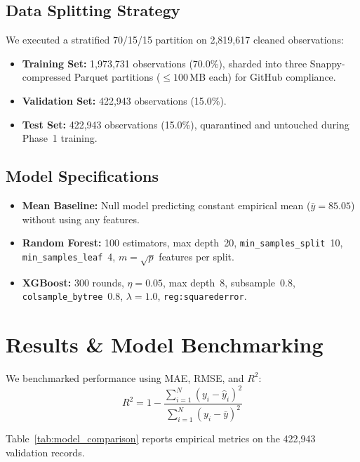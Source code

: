 \documentclass[conference]{IEEEtran}
\begin{document}
\subsection{Data Splitting Strategy}

We executed a stratified 70/15/15 partition on 2,819,617 cleaned
observations:
\begin{itemize}
  \item \textbf{Training Set:} 1,973,731 observations (70.0\%),
        sharded into three Snappy-compressed Parquet partitions
        (${\le}100$\,MB each) for GitHub compliance.
  \item \textbf{Validation Set:} 422,943 observations (15.0\%).
  \item \textbf{Test Set:} 422,943 observations (15.0\%),
        quarantined and untouched during Phase~1 training.
\end{itemize}

\subsection{Model Specifications}

\begin{itemize}
  \item \textbf{Mean Baseline:} Null model predicting constant empirical
        mean ($\bar{y} = 85.05$) without using any features.
  \item \textbf{Random Forest:} 100 estimators, max depth~20,
        \texttt{min\_samples\_split}~10, \texttt{min\_samples\_leaf}~4,
        $m = \sqrt{p}$ features per split.
  \item \textbf{XGBoost:} 300 rounds, $\eta = 0.05$, max depth~8,
        subsample~0.8, \texttt{colsample\_bytree}~0.8,
        $\lambda = 1.0$, \texttt{reg:squarederror}.
\end{itemize}

\section{Results \& Model Benchmarking}
\label{sec:results}

We benchmarked performance using MAE, RMSE, and $R^2$:
\begin{equation}
  R^2 = 1 - \frac{\sum_{i=1}^N (y_i - \hat{y}_i)^2}
                 {\sum_{i=1}^N (y_i - \bar{y})^2}
\end{equation}

Table~\ref{tab:model_comparison} reports empirical metrics on the
422,943 validation records.
\end{document}
